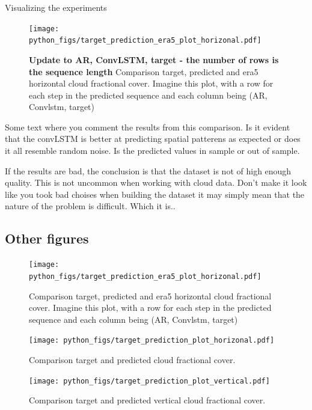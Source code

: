 Visualizing the experiments 
\begin{figure}[ht]
    \centering
    \texttt{[image: python\_figs/target\_prediction\_era5\_plot\_horizonal.pdf]}
    \caption{\textbf{Update to AR, ConvLSTM, target - the number of rows is the sequence length} Comparison target, predicted and era5 horizontal cloud fractional cover. Imagine this plot, with a row for each step in the predicted sequence and each column being (AR, Convlstm, target)}
    \label{fig:target_predict_era5_horizontal}
\end{figure}

Some text where you comment the results from this comparison. Is it evident that the convLSTM is better at predicting spatial patterens as expected or does it all resemble random noise. Is the predicted values in sample or out of sample.

If the results are bad, the conclusion is that the dataset is not of high enough quality. This is not uncommon when working with cloud data. Don't make it look like you took bad choises when building the dataset it may simply mean that the nature of the problem is difficult. Which it is..


\subsection{Other figures}
\begin{figure}[ht]
    \centering
    \texttt{[image: python\_figs/target\_prediction\_era5\_plot\_horizonal.pdf]}
    \caption{Comparison target, predicted and era5 horizontal cloud fractional cover. Imagine this plot, with a row for each step in the predicted sequence and each column being (AR, Convlstm, target)}
    \label{fig:target_predict_era5_horizontal}
\end{figure}

\begin{figure}[ht]
    \centering
    \texttt{[image: python\_figs/target\_prediction\_plot\_horizonal.pdf]}
    \caption{Comparison target and predicted cloud fractional cover.}
    \label{fig:target_predict_horizontal}
\end{figure}

\begin{figure}[ht]
    \centering
    \texttt{[image: python\_figs/target\_prediction\_plot\_vertical.pdf]}
    \caption{Comparison target and predicted vertical cloud fractional cover.}
    \label{fig:target_predict_vertical}
\end{figure}

